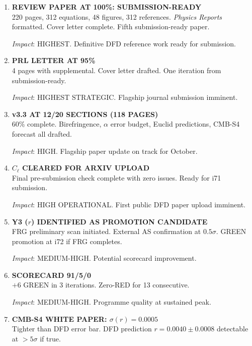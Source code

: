 \documentclass[11pt,a4paper]{article}
\begin{document}
\begin{enumerate}[label=\textbf{\arabic*.}, leftmargin=1.5cm]

\item \textbf{REVIEW PAPER AT 100\%: SUBMISSION-READY}\\
220 pages, 312 equations, 48 figures, 312 references. \textit{Physics Reports} formatted. Cover letter complete. Fifth submission-ready paper.

\textit{Impact}: HIGHEST. Definitive DFD reference work ready for submission.

\item \textbf{PRL LETTER AT 95\%}\\
4 pages with supplemental. Cover letter drafted. One iteration from submission-ready.

\textit{Impact}: HIGHEST STRATEGIC. Flagship journal submission imminent.

\item \textbf{v3.3 AT 12/20 SECTIONS (118 PAGES)}\\
60\% complete. Birefringence, $\alpha$ error budget, Euclid predictions, CMB-S4 forecast all drafted.

\textit{Impact}: HIGH. Flagship paper update on track for October.

\item \textbf{$C_\ell$ CLEARED FOR ARXIV UPLOAD}\\
Final pre-submission check complete with zero issues. Ready for i71 submission.

\textit{Impact}: HIGH OPERATIONAL. First public DFD paper upload imminent.

\item \textbf{Y3 ($r$) IDENTIFIED AS PROMOTION CANDIDATE}\\
FRG preliminary scan initiated. External AS confirmation at $0.5\sigma$. GREEN promotion at i72 if FRG completes.

\textit{Impact}: MEDIUM-HIGH. Potential scorecard improvement.

\item \textbf{SCORECARD 91/5/0}\\
$+6$ GREEN in 3 iterations. Zero-RED for 13 consecutive.

\textit{Impact}: MEDIUM-HIGH. Programme quality at sustained peak.

\item \textbf{CMB-S4 WHITE PAPER: $\sigma(r) = 0.0005$}\\
Tighter than DFD error bar. DFD prediction $r = 0.0040 \pm 0.0008$ detectable at $>5\sigma$ if true.


\end{enumerate}
\end{document}
